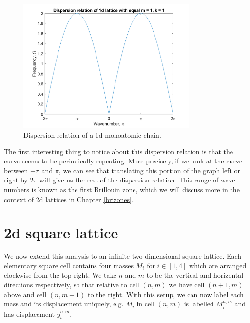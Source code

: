 \begin{figure}[!h]
\centering
\includegraphics[width=0.8\textwidth]{imgs/1ddispersion.png}
\caption{\label{fig:dc1}Dispersion relation of a 1d monoatomic
         chain.}
\end{figure}

The first interesting thing to notice about this dispersion relation is that
the curve seems to be periodically repeating. More precisely, if we look at the
curve between $-\pi$ and $\pi$, we can see that translating this portion of the
graph left or right by $2\pi$ will give us the rest of the dispersion relation.
This range of wave numbers is known as the first Brillouin zone, which we will
discuss more in the context of 2d lattices in Chapter \ref{brizones}.

\section{2d square lattice}
\begin{center}
\end{center}

We now extend this analysis to an infinite two-dimensional square lattice. Each
elementary square cell contains four masses $M_i$ for $i\in\left[1, 4\right]$
which are arranged clockwise from the top right. We take $n$ and $m$ to be the
vertical and horizontal directions respectively, so that relative to cell $(n,
m)$ we have cell $(n+1,m)$ above and cell $(n,m+1)$ to the right. With this
setup, we can now label each mass and its displacement uniquely, e.g. $M_i$ in
cell $(n, m)$ is labelled $M_i^{n,m}$ and has displacement $y_i^{n,m}$.

